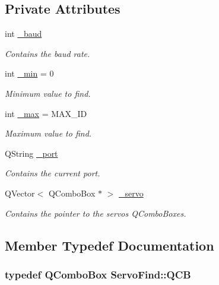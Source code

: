 \subsection*{Private Attributes}
\begin{DoxyCompactItemize}
\item 
int \hyperlink{a00008_ad2f3b1ab924ff2051178eb981d030b66}{\+\_\+baud}
\begin{DoxyCompactList}\small\item\em Contains the baud rate. \end{DoxyCompactList}\item 
int \hyperlink{a00008_a65a3d5606c9a8bcd6ace9be36c3551e1}{\+\_\+min} = 0
\begin{DoxyCompactList}\small\item\em Minimum value to find. \end{DoxyCompactList}\item 
int \hyperlink{a00008_abb4bcc300ab0a9c1df3c41b4e7d1fe2d}{\+\_\+max} = M\+A\+X\+\_\+\+I\+D
\begin{DoxyCompactList}\small\item\em Maximum value to find. \end{DoxyCompactList}\item 
Q\+String \hyperlink{a00008_acc6d9f94a8cf7a7a777fd9c818d98207}{\+\_\+port}
\begin{DoxyCompactList}\small\item\em Contains the current port. \end{DoxyCompactList}\item 
Q\+Vector$<$ Q\+Combo\+Box $\ast$ $>$ \hyperlink{a00008_a571ee1fc45255666e5baa0d5e9111551}{\+\_\+servo}
\begin{DoxyCompactList}\small\item\em Contains the pointer to the servos Q\+Combo\+Boxes. \end{DoxyCompactList}\end{DoxyCompactItemize}


\subsection{Member Typedef Documentation}
\hypertarget{a00008_a8cfdbef4d4dc51f1b200a885ff827711}{}
\subsubsection[{Q\+C\+B}]{\setlength{\rightskip}{0pt plus 5cm}typedef Q\+Combo\+Box {\bf Servo\+Find\+::\+Q\+C\+B}\hspace{0.3cm}{\ttfamily [private]}}\label{a00008_a8cfdbef4d4dc51f1b200a885ff827711}


